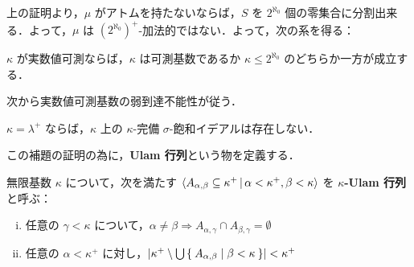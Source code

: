 \documentclass[a4j]{jsarticle}
\begin{document}
上の証明より，$\mu$ がアトムを持たないならば，$S$ を $2^{\aleph_0}$ 個の零集合に分割出来る．よって，$\mu$ は $(2^{\aleph_0})^+$-加法的ではない．よって，次の系を得る：

\begin{corollary}
 $\kappa$ が実数値可測ならば，$\kappa$ は可測基数であるか $\kappa \leq 2^{\aleph_0}$ のどちらか一方が成立する．
\end{corollary}

次から実数値可測基数の弱到達不能性が従う．

\begin{lemma}
 $\kappa = \lambda^+$ ならば，$\kappa$ 上の $\kappa$-完備 $\sigma$-飽和イデアルは存在しない．
\end{lemma}

この補題の証明の為に，{\bfseries Ulam 行列}という物を定義する．

\begin{definition}[Ulam 行列]
 無限基数 $\kappa$ について，次を満たす $\Braket{A_{\alpha, \beta} \subseteq \kappa^+ | \alpha < \kappa^+, \beta < \kappa }$ を {\bfseries $\kappa$-Ulam 行列} と呼ぶ：
 \begin{enumerate}[(i)]
 \item 任意の $\gamma < \kappa$ について，$\alpha \neq \beta \Rightarrow A_{\alpha,\gamma} \cap A_{\beta, \gamma} = \emptyset$
 \item 任意の $\alpha < \kappa^+$ に対し，$\left|\kappa^+ \setminus \bigcup\Set{A_{\alpha, \beta} | \beta < \kappa}\right| < \kappa^+$
 \end{enumerate}
\end{definition}
\end{document}

